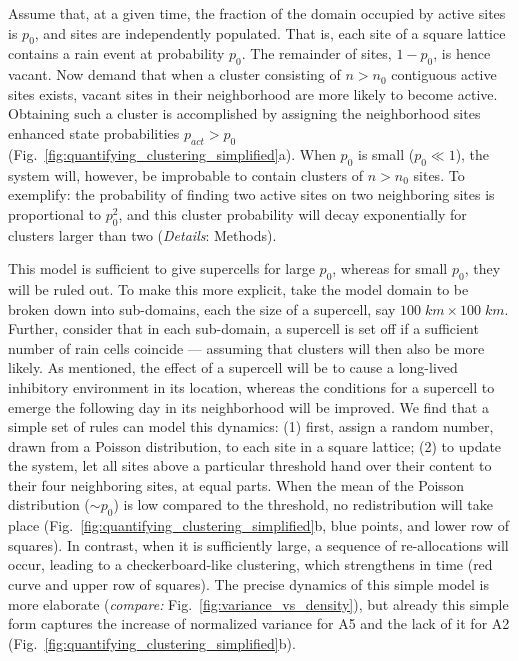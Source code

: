 \documentclass[draft,linenumbers]{agujournal2019}
\begin{document}
Assume that, at a given time, the fraction of the domain occupied by active sites is $p_0$, and sites are independently populated. That is, each site of a square lattice contains a rain event at probability $p_0$.
The remainder of sites, $1-p_0$, is hence vacant.
Now demand that when a cluster consisting of $n>n_0$ contiguous active sites exists, vacant sites in their neighborhood are more likely to become active. 
Obtaining such a cluster is accomplished by assigning the neighborhood sites enhanced state probabilities $p_{act}>p_0$
(Fig.~\ref{fig:quantifying_clustering_simplified}a).
When $p_0$ is small ($p_0\ll 1$), the system will, however, be improbable to contain clusters of $n>n_0$ sites.
To exemplify: the probability of finding two active sites on two neighboring sites is proportional to $p_0^2$, and this cluster probability will decay exponentially for clusters larger than two ({\it Details}: Methods).

This model is sufficient to give supercells for large $p_0$, whereas for small $p_0$, they will be ruled out.
To make this more explicit, take the model domain to be broken down into sub-domains, each the size of a supercell, say $100\;km\times 100\;km$.
Further, consider that in each sub-domain, a supercell is set off if a sufficient number of rain cells coincide --- assuming that clusters will then also be more likely.
As mentioned, the effect of a supercell will be to cause a long-lived inhibitory environment in its location, whereas the conditions for a supercell to emerge the following day in its neighborhood will be improved. 
We find that a simple set of rules can model this dynamics: 
(1) first, assign a random number, drawn from a Poisson distribution, to each site in a square lattice; 
(2) to update the system, let all sites above a particular threshold hand over their content to their four neighboring sites, at equal parts. 
When the mean of the Poisson distribution ($\sim p_0$) is low compared to the threshold, no redistribution will take place (Fig.~\ref{fig:quantifying_clustering_simplified}b, blue points, and lower row of squares). 
In contrast, when it is sufficiently large, a sequence of re-allocations will occur, leading to a checkerboard-like clustering, which strengthens in time (red curve and upper row of squares).
The precise dynamics of this simple model is more elaborate ({\it compare:} Fig.~\ref{fig:variance_vs_density}), but already this simple form captures the increase of normalized variance for A5 and the lack of it for A2 (Fig.~\ref{fig:quantifying_clustering_simplified}b).
\end{document}
